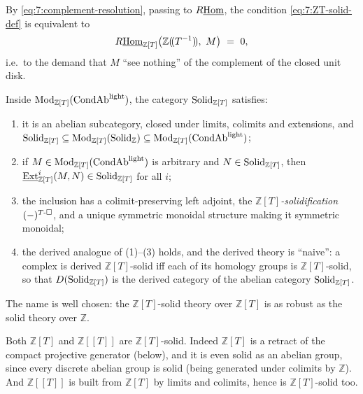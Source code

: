 By \eqref{eq:7:complement-resolution}, passing to $R\underline{\operatorname{Hom}}$, the condition
\eqref{eq:7:ZT-solid-def} is equivalent to
\begin{equation*}
R\iHom_{\mathbb{Z}[T]}\bigl(\mathbb{Z}(\!(T^{-1})\!),\ M\bigr)\ =\ 0,
\end{equation*}
i.e.\ to the demand that $M$ ``see nothing'' of the complement of the closed
unit disk.

\begin{theorem}
\label{thm:7:ZT-solid-structure}
Inside $\mathrm{Mod}_{\mathbb{Z}[T]}(\mathrm{CondAb}^{\mathrm{light}})$, the category
$\mathrm{Solid}_{\mathbb{Z}[T]}$ satisfies:
\begin{enumerate}
\item it is an abelian subcategory, closed under limits, colimits and
extensions, and $\mathrm{Solid}_{\mathbb{Z}[T]}\subseteq\mathrm{Mod}_{\mathbb{Z}[T]}
(\mathrm{Solid}_{\mathbb{Z}})\subseteq\mathrm{Mod}_{\mathbb{Z}[T]}(\mathrm{CondAb}^{\mathrm{light}})$;
\item if $M\in\mathrm{Mod}_{\mathbb{Z}[T]}(\mathrm{CondAb}^{\mathrm{light}})$ is arbitrary and $N\in
\mathrm{Solid}_{\mathbb{Z}[T]}$, then $\underline{\operatorname{Ext}}^{i}_{\mathbb{Z}[T]}(M,N)\in
\mathrm{Solid}_{\mathbb{Z}[T]}$ for all $i$;
\item the inclusion has a colimit-preserving left adjoint, the
\emph{$\mathbb{Z}[T]$-solidification} $(-)^{T\text{-}\square}$, and a unique symmetric
monoidal structure making it symmetric monoidal;
\item the derived analogue of \textup{(1)--(3)} holds, and the derived theory
is ``naive'': a complex is derived $\mathbb{Z}[T]$-solid iff each of its
homology groups is $\mathbb{Z}[T]$-solid, so that $D(\mathrm{Solid}_{\mathbb{Z}[T]})$
is the derived category of the abelian category $\mathrm{Solid}_{\mathbb{Z}[T]}$.
\end{enumerate}
\end{theorem}

The name is well chosen: the $\mathbb{Z}[T]$-solid theory over $\mathbb{Z}[T]$
is as robust as the solid theory over $\mathbb{Z}$.

\begin{remark}
\label{rmk:7:ZT-is-solid}
Both $\mathbb{Z}[T]$ and $\mathbb{Z}[\![T]\!]$ are $\mathbb{Z}[T]$-solid.
Indeed $\mathbb{Z}[T]$ is a retract of the compact projective generator (below),
and it is even solid as an abelian group, since every discrete abelian group is
solid (being generated under colimits by $\mathbb{Z}$). And $\mathbb{Z}[\![T]\!]$
is built from $\mathbb{Z}[T]$ by limits and colimits, hence is
$\mathbb{Z}[T]$-solid too.
\end{remark}

